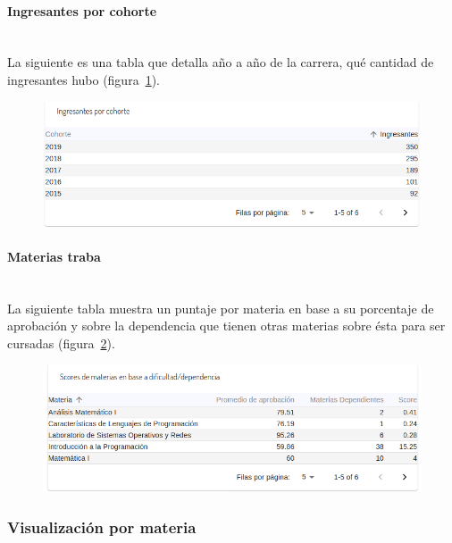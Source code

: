 \paragraph{Ingresantes por cohorte} \mbox{}\\
La siguiente es una tabla que detalla año a año de la carrera, qué cantidad de ingresantes hubo  (figura~\ref{fig:sa-ingresantes-cohorte}).

\begin{figure}[H]
  \centering
    \includegraphics[scale=0.4]{images/seguimiento-academico/sa-ingresantes-cohorte.png}
  \label{fig:sa-ingresantes-cohorte}
\end{figure}

\paragraph{Materias traba} \mbox{}\\
La siguiente tabla muestra un puntaje por materia en base a su porcentaje de aprobación y sobre la dependencia que tienen otras materias sobre ésta para ser cursadas  (figura~\ref{fig:sa-materias-traba}).

\begin{figure}[H]
  \centering
    \includegraphics[scale=0.4]{images/seguimiento-academico/sa-materias-traba.png}
  \label{fig:sa-materias-traba}
\end{figure}


\subsubsection{Visualización por materia}

